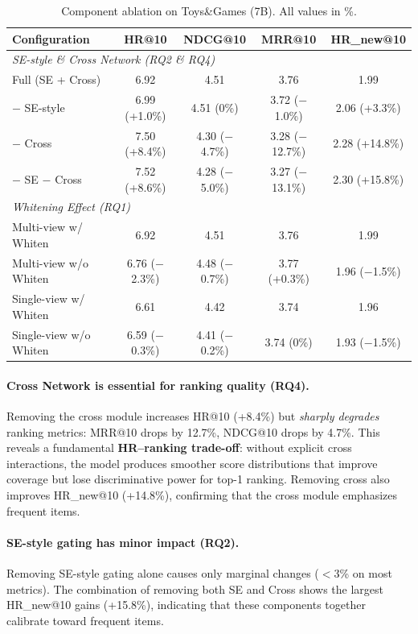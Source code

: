 \documentclass[sigconf,natbib=true]{acmart}
\begin{document}
\begin{table}[t]
\caption{Component ablation on Toys\&Games (7B). All values in \%.}
\label{tab:ablation}
\centering
\scriptsize
\begin{tabular}{@{}lcccc@{}}
\toprule
\textbf{Configuration} & HR@10 & NDCG@10 & MRR@10 & HR\_new@10 \\
\midrule
\multicolumn{5}{l}{\textit{SE-style \& Cross Network (RQ2 \& RQ4)}} \\
Full (SE + Cross) & 6.92 & 4.51 & 3.76 & 1.99 \\
$-$ SE-style & 6.99 (+1.0\%) & 4.51 (0\%) & 3.72 ($-$1.0\%) & 2.06 (+3.3\%) \\
$-$ Cross & 7.50 (+8.4\%) & 4.30 ($-$4.7\%) & 3.28 ($-$12.7\%) & 2.28 (+14.8\%) \\
$-$ SE $-$ Cross & 7.52 (+8.6\%) & 4.28 ($-$5.0\%) & 3.27 ($-$13.1\%) & 2.30 (+15.8\%) \\
\midrule
\multicolumn{5}{l}{\textit{Whitening Effect (RQ1)}} \\
Multi-view w/ Whiten & 6.92 & 4.51 & 3.76 & 1.99 \\
Multi-view w/o Whiten & 6.76 ($-$2.3\%) & 4.48 ($-$0.7\%) & 3.77 (+0.3\%) & 1.96 ($-$1.5\%) \\
Single-view w/ Whiten & 6.61 & 4.42 & 3.74 & 1.96 \\
Single-view w/o Whiten & 6.59 ($-$0.3\%) & 4.41 ($-$0.2\%) & 3.74 (0\%) & 1.93 ($-$1.5\%) \\
\bottomrule
\end{tabular}
\end{table}

\paragraph{Cross Network is essential for ranking quality (RQ4).}
Removing the cross module increases HR@10 (+8.4\%) but \emph{sharply degrades}
ranking metrics: MRR@10 drops by 12.7\%, NDCG@10 drops by 4.7\%.
This reveals a fundamental \textbf{HR--ranking trade-off}: without
explicit cross interactions, the model produces smoother score
distributions that improve coverage but lose discriminative power
for top-1 ranking. Removing cross also improves HR\_new@10 (+14.8\%),
confirming that the cross module emphasizes frequent items.

\paragraph{SE-style gating has minor impact (RQ2).}
Removing SE-style gating alone causes only marginal changes ($<$3\% on
most metrics). The combination of removing both SE and Cross
shows the largest HR\_new@10 gains (+15.8\%), indicating that these
components together calibrate toward frequent items.
\end{document}
